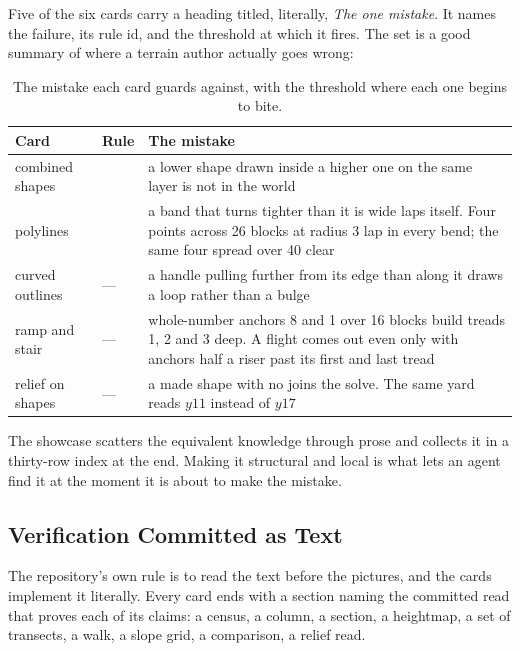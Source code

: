 Five of the six cards carry a heading titled, literally, \emph{The one mistake}. It
names the failure, its rule id, and the threshold at which it fires. The set is a
good summary of where a terrain author actually goes wrong:

\begin{table}[htbp]
\caption{The mistake each card guards against, with the threshold where each one
begins to bite.}
\label{tab:one-mistake}
\small
\begin{tabularx}{\textwidth}{L{3.5cm} L{1.6cm} Y}
\toprule
\textbf{Card} & \textbf{Rule} & \textbf{The mistake} \\
\midrule
combined shapes &  & a lower shape drawn inside a higher one on the same
  layer is not in the world \\
polylines &  & a band that turns tighter than it is wide laps itself.
  Four points across 26 blocks at radius 3 lap in every bend; the same four spread
  over 40 clear \\
curved outlines & --- & a handle pulling further from its edge than along it draws
  a loop rather than a bulge \\
ramp and stair & --- & whole-number anchors 8 and 1 over 16 blocks build treads 1,
  2 and 3 deep. A flight comes out even only with anchors half a riser past its
  first and last tread \\
relief on shapes & --- & a made shape with no  joins the solve.
  The same yard reads $y11$ instead of $y17$ \\
\bottomrule
\end{tabularx}
\end{table}

The showcase scatters the equivalent knowledge through prose and collects it in a
thirty-row index at the end. Making it structural and local is what lets an agent
find it at the moment it is about to make the mistake.

\subsection{Verification Committed as Text}

The repository's own rule is to read the text before the pictures, and the cards
implement it literally. Every card ends with a section naming the committed read
that proves each of its claims: a census, a column, a section, a heightmap, a set
of transects, a walk, a slope grid, a comparison, a relief read.

